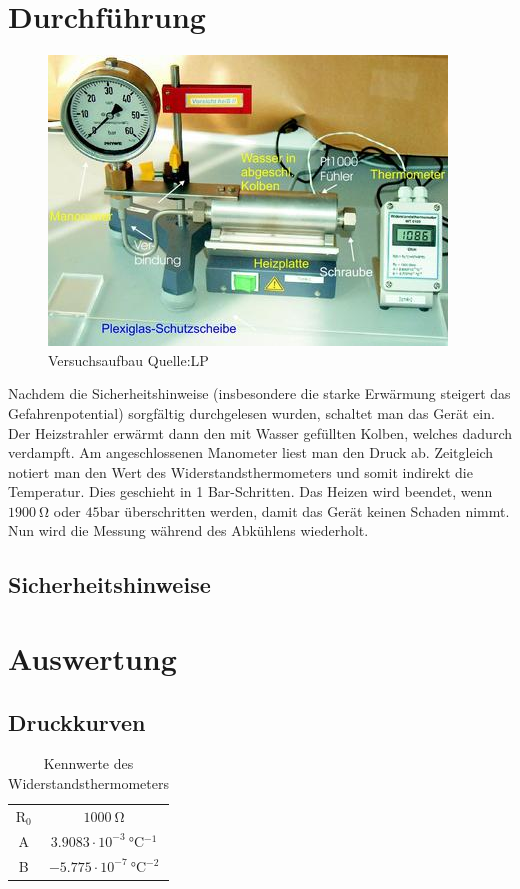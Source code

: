 \documentclass[12pt,a4paper,titlepage,headinclude,bibtotoc]{scrartcl}
\begin{document}
\section{Durchführung}
\label{sec:durchfuehrung}
\begin{figure}[!htb]
	\centering
	\includegraphics[scale=1.0]{Aufbau.jpg}
	\caption{Versuchsaufbau Quelle:LP}	
	\label{fig:Aufbau}
\end{figure}

Nachdem die Sicherheitshinweise (insbesondere die starke Erwärmung steigert das Gefahrenpotential) sorgfältig durchgelesen wurden, schaltet man das Gerät ein.
Der Heizstrahler erwärmt dann den mit Wasser gefüllten Kolben, welches dadurch verdampft.
Am angeschlossenen Manometer liest man den Druck ab.
Zeitgleich notiert man den Wert des Widerstandsthermometers und somit indirekt die Temperatur.
Dies geschieht in 1 Bar-Schritten.
Das Heizen wird beendet, wenn $1900 ~\si{\ohm}$ oder $45 \si{\bar}$ überschritten werden, damit das Gerät keinen Schaden nimmt.
Nun wird die Messung während des Abkühlens wiederholt.

\subsection{Sicherheitshinweise}


\section{Auswertung}
\label{sec:auswertung}
\subsection{Druckkurven}
\begin{table}
 \centering
 \begin{tabular}{|c|c|}
   \hline
   R$_0$ & $1000 ~ \si{\ohm}$\\
   A   & $3.9083 \cdot 10^{-3} ~ \si{\celsius^{-1}}$\\
   B   & $-5.775 \cdot 10^{-7} ~ \si{\celsius^{-2}}$\\
   \hline
 \end{tabular}
 \caption{Kennwerte des Widerstandsthermometers}
 \label{tab:Pt1000}
\end{table}
\end{document}
